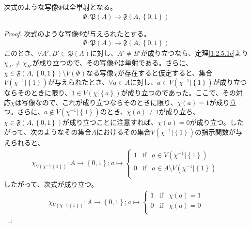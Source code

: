 \documentclass[dvipdfmx]{jsarticle}
\begin{document}
\begin{thm}\label{1.2.5.1d}
次式のような写像$\varPhi$は全単射となる。
\begin{align*}
  \varPhi:\mathfrak{P}(A)\mathfrak{\rightarrow F}\left( A,\left\{ 0,1 \right\} \right)
\end{align*}
\end{thm}
\begin{proof}
次式のような写像$\varPhi$が与えられたとする。
\begin{align*}
\varPhi:\mathfrak{P}(A) \rightarrow \mathfrak{F}\left( A,\left\{ 0,1 \right\} \right)
\end{align*}
このとき、$\forall A',B'\in \mathfrak{P}(A)$に対し、$A' \neq B' $が成り立つなら、定理\ref{1.2.5.1c}より$\chi_{A'} \neq \chi_{B'} $が成り立つので、その写像$\varPhi$は単射である。さらに、$\chi \in \mathfrak{F}\left( A,\left\{ 0,1 \right\} \right) \setminus V(\varPhi)$なる写像$\chi$が存在すると仮定すると、集合$V\left( \chi^{- 1}|\left\{ 1 \right\} \right)$が与えられたとき、$\forall a \in A$に対し、$a \in V\left( \chi^{- 1}|\left\{ 1 \right\} \right)$が成り立つならそのときに限り、$1 \in V\left( \chi|\left\{ a \right\} \right) $が成り立つのであった。ここで、その対応$\chi$は写像なので、これが成り立つならそのときに限り、$\chi(a) = 1 $が成り立つ。さらに、$a \notin V\left( \chi^{- 1}|\left\{ 1 \right\} \right)$のとき、$\chi(a) \neq 1$が成り立ち、$\chi \in \mathfrak{F}\left( A,\left\{ 0,1 \right\} \right)$が成り立つことに注意すれば、$\chi(a) = 0$が成り立つ。したがって、次のようなその集合$A$におけるその集合$V\left( \chi^{- 1}|\left\{ 1 \right\} \right)$の指示関数が与えられると、
\begin{align*}
\chi_{V\left( \chi^{- 1}|\left\{ 1 \right\} \right)}:A \rightarrow \left\{ 0,1 \right\};a \mapsto \left\{ \begin{matrix}
1 & {\mathrm{if}} & a \in V\left( \chi^{- 1}|\left\{ 1 \right\} \right) \\
0 & {\mathrm{if}} & a \in A \setminus V\left( \chi^{- 1}|\left\{ 1 \right\} \right) \\
\end{matrix} \right.\ 
\end{align*}
したがって、次式が成り立つ。
\begin{align*}
\chi_{V\left( \chi^{- 1}|\left\{ 1 \right\} \right)}:A \rightarrow \left\{ 0,1 \right\};a \mapsto \left\{ \begin{matrix}
1 & {\mathrm{if}} & \chi(a) = 1 \\
0 & {\mathrm{if}} & \chi(a) = 0 \\

\end{matrix}
\end{align*}
\end{proof}
\end{document}
